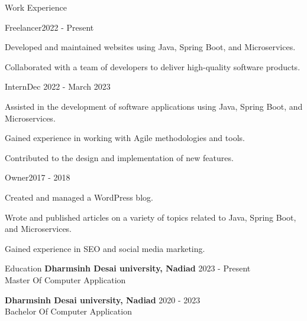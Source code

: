 \documentclass{resume} %
\begin{document}
    \begin{rSection}{Work Experience}
                    \begin{rSubsection}
                {Freelancer}{2022 - Present}
                                    {}
                                {\normalfont{\textit{}}}
                                    \item Developed and maintained websites using Java, Spring Boot, and Microservices.
                                    \item Collaborated with a team of developers to deliver high{-}quality software products.
                            \end{rSubsection}
                    \begin{rSubsection}
                {Intern}{Dec 2022 - March 2023}
                                    {}
                                {\normalfont{\textit{}}}
                                    \item Assisted in the development of software applications using Java, Spring Boot, and Microservices.
                                    \item Gained experience in working with Agile methodologies and tools.
                                    \item Contributed to the design and implementation of new features.
                            \end{rSubsection}
                    \begin{rSubsection}
                {Owner}{2017 - 2018}
                                    {}
                                {\normalfont{\textit{}}}
                                    \item Created and managed a WordPress blog.
                                    \item Wrote and published articles on a variety of topics related to Java, Spring Boot, and Microservices.
                                    \item Gained experience in SEO and social media marketing.
                            \end{rSubsection}
            \end{rSection}

\begin{rSection}{Education}
                        \textbf{Dharmsinh Desai university, Nadiad} \hfill {2023 - Present} \\
                            {Master Of Computer Application}
                         
             
         
                        \textbf{Dharmsinh Desai university, Nadiad} \hfill {2020 - 2023} \\
                            {Bachelor Of Computer Application}
                         
             
         
    \end{rSection}
\end{document}
